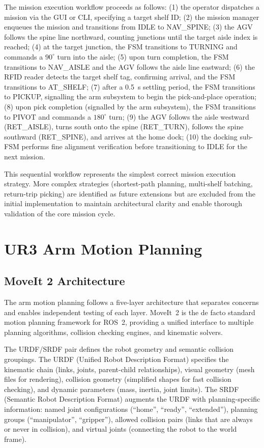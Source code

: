 \documentclass[12pt,a4paper,oneside]{report}
\begin{document}
The mission execution workflow proceeds as follows: (1) the operator dispatches a mission via the GUI or CLI, specifying a target shelf ID; (2) the mission manager enqueues the mission and transitions from IDLE to NAV\_SPINE; (3) the AGV follows the spine line northward, counting junctions until the target aisle index is reached; (4) at the target junction, the FSM transitions to TURNING and commands a $90^{\circ}$ turn into the aisle; (5) upon turn completion, the FSM transitions to NAV\_AISLE and the AGV follows the aisle line eastward; (6) the RFID reader detects the target shelf tag, confirming arrival, and the FSM transitions to AT\_SHELF; (7) after a 0.5~s settling period, the FSM transitions to PICKUP, signalling the arm subsystem to begin the pick-and-place operation; (8) upon pick completion (signalled by the arm subsystem), the FSM transitions to PIVOT and commands a $180^{\circ}$ turn; (9) the AGV follows the aisle westward (RET\_AISLE), turns south onto the spine (RET\_TURN), follows the spine southward (RET\_SPINE), and arrives at the home dock; (10) the docking sub-FSM performs fine alignment verification before transitioning to IDLE for the next mission.

This sequential workflow represents the simplest correct mission execution strategy. More complex strategies (shortest-path planning, multi-shelf batching, return-trip picking) are identified as future extensions but are excluded from the initial implementation to maintain architectural clarity and enable thorough validation of the core mission cycle.

\section{UR3 Arm Motion Planning}

\subsection{MoveIt 2 Architecture}

The arm motion planning follows a five-layer architecture that separates concerns and enables independent testing of each layer. MoveIt~2 is the de facto standard motion planning framework for ROS~2, providing a unified interface to multiple planning algorithms, collision checking engines, and kinematic solvers.

The URDF/SRDF pair defines the robot geometry and semantic collision groupings. The URDF (Unified Robot Description Format) specifies the kinematic chain (links, joints, parent-child relationships), visual geometry (mesh files for rendering), collision geometry (simplified shapes for fast collision checking), and dynamic parameters (mass, inertia, joint limits). The SRDF (Semantic Robot Description Format) augments the URDF with planning-specific information: named joint configurations (``home'', ``ready'', ``extended''), planning groups (``manipulator'', ``gripper''), allowed collision pairs (links that are always or never in collision), and virtual joints (connecting the robot to the world frame).
\end{document}

